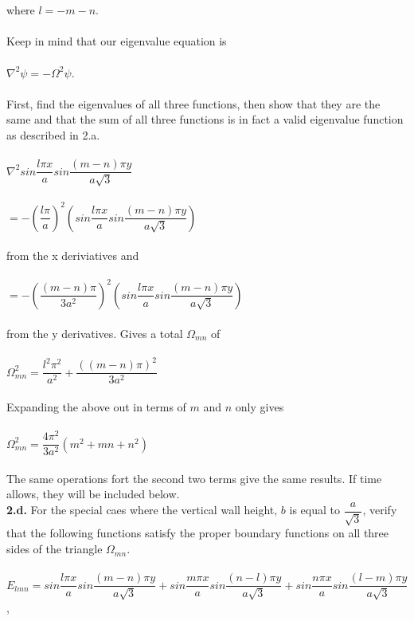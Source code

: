 \documentclass[prb,preprint]
{revtex4-1}
\newcommand{\PRLsep}{\noindent\makebox[\linewidth]{\resizebox{0.8888\linewidth}{2pt}{$\bullet$}}\bigskip}
\begin{document}
\\
\\
where $l = -m-n$.  
\\
\\
Keep in mind that our eigenvalue equation is 
\\
\\
$\nabla^2\psi = -\Omega^2 \psi$.
\\
\\
First, find the eigenvalues of all three functions, then show that they are the same and that the sum of all three functions is in fact a valid eigenvalue function as described in 2.a.
\\
\\
$\nabla^2 sin\dfrac{l\pi x}{a} sin\dfrac{\left(m-n\right) \pi y}{a \sqrt{3}}$
\\
\\
$= -\left(\dfrac{l\pi}{a}\right)^2\left(sin\dfrac{l\pi x}{a} sin\dfrac{\left(m-n\right) \pi y}{a \sqrt{3}}\right)$
\\
\\
from the x deriviatives and 
\\
\\
$= -\left(\dfrac{\left(m-n\right)\pi}{3a^2}\right)^2\left(sin\dfrac{l\pi x}{a} sin\dfrac{\left(m-n\right) \pi y}{a \sqrt{3}}\right)$
\\
\\
from the y derivatives.  Gives a total $\Omega_{mn}$ of 
\\
\\
$\Omega_{mn}^2 = \dfrac{l^2 \pi^2}{a^2} + \dfrac{\left(\left(m-n\right)\pi\right)^2}{3a^2}$
\\
\\
Expanding the above out in terms of $m$ and $n$ only gives
\\
\\
$\Omega_{mn}^2 = \dfrac{4 \pi^2}{3a^2}\left(m^2 + mn + n^2\right)$
\\
\\
The same operations fort the second two terms give the same results.  If time allows, they will be included below.
\PRLsep
\\
\newpage
\textbf{2.d.}
For the special caes where the vertical wall height, $b$ is equal to $\dfrac{a}{\sqrt{3}}$, verify that the following functions satisfy the proper boundary functions on all three sides of the triangle $\Omega_{mn}$.
\\
\\
$E_{lmn} = sin\dfrac{l\pi x}{a} sin\dfrac{\left(m-n\right)\pi y}{a\sqrt{3}} + sin\dfrac{m\pi x}{a} sin\dfrac{\left(n-l\right)\pi y}{a\sqrt{3}} + sin\dfrac{n\pi x}{a} sin\dfrac{\left(l-m\right)\pi y}{a\sqrt{3}}$,
\end{document}
